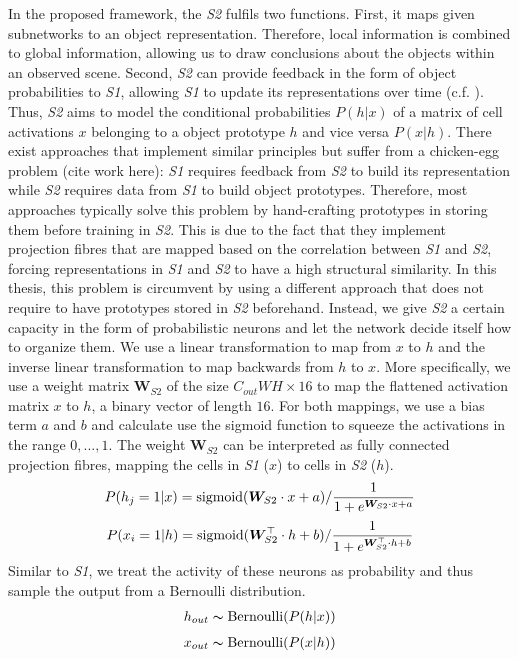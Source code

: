 In the proposed framework, the \emph{S2} fulfils two functions. First, it maps given subnetworks to an object representation. Therefore, local information is combined to global information, allowing us to draw conclusions about the objects within an observed scene. Second, \emph{S2} can provide feedback in the form of object probabilities to \emph{S1}, allowing \emph{S1} to update its representations over time (c.f. ).
Thus, \emph{S2} aims to model the conditional probabilities $P(h|x)$ of a matrix of cell activations $x$ belonging to a object prototype $h$ and vice versa $P(x|h)$.
There exist approaches that implement similar principles but suffer from a chicken-egg problem (cite work here): \emph{S1} requires feedback from \emph{S2} to build its representation while \emph{S2} requires data from \emph{S1} to build object prototypes. Therefore, most approaches typically solve this problem by hand-crafting prototypes in storing them before training in \emph{S2}. This is due to the fact that they implement projection fibres that are mapped based on the correlation between \emph{S1} and \emph{S2}, forcing representations in \emph{S1} and \emph{S2} to have a high structural similarity.
In this thesis, this problem is circumvent by using a different approach that does not require to have prototypes stored in \emph{S2} beforehand. Instead, we give \emph{S2} a certain capacity in the form of probabilistic neurons and let the network decide itself how to organize them. 
We use a linear transformation to map from $x$ to $h$ and the inverse linear transformation to map backwards from $h$ to $x$.
More specifically, we use a weight matrix $\boldsymbol{W}_{S2}$ of the size $C_{out}WH \times 16$ to map the flattened activation matrix $x$ to $h$, a binary vector of length $16$. For both mappings, we use a bias term $a$ and $b$ and calculate use the sigmoid function to squeeze the activations in the range $0, ..., 1$. 
The weight $\boldsymbol{W}_{S2}$ can be interpreted as fully connected projection fibres, mapping the cells in \emph{S1} ($x$) to cells in \emph{S2} ($h$).
\begin{align}\eqlbl{l2_1}
	P(h_j=1 | x) = \text{sigmoid}(\boldsymbol{W}_{S2} \cdot x + a) / \frac{1}{1 + e^{\boldsymbol{W}_{S2} \cdot x + a}}
\end{align}
\begin{align}\eqlbl{l2_2}
	P(x_i=1 | h) = \text{sigmoid}(\boldsymbol{W}_{S2}^\top \cdot h + b) / \frac{1}{1 + e^{\boldsymbol{W}_{S2}^\top \cdot h + b}}
\end{align}
Similar to \emph{S1}, we treat the activity of these neurons as probability and thus sample the output from a Bernoulli distribution.
\begin{align}\eqlbl{l2_3}
	h_{out} \thicksim \text{Bernoulli}(P(h | x) )
\end{align}
\begin{align}\eqlbl{l2_4}
	x_{out} \thicksim \text{Bernoulli}(P(x | h))
\end{align}

